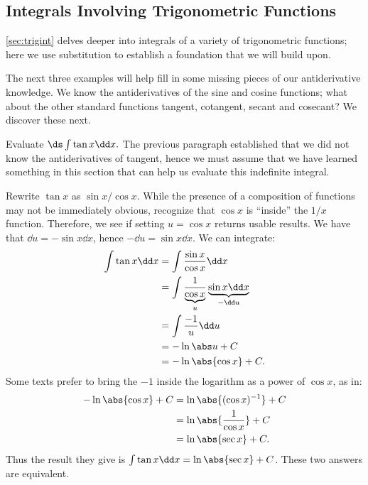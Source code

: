 \subsection{Integrals Involving Trigonometric Functions}

\autoref{sec:trigint} delves deeper into integrals of a variety of trigonometric functions; here we use substitution to establish a foundation that we will build upon. 

The next three examples will help fill in some missing pieces of our antiderivative knowledge. We know the antiderivatives of the sine and cosine functions; what about the other standard functions tangent, cotangent, secant and cosecant? We discover these next.

\begin{example}\label{ex_sub6}
Evaluate $\ds \int \tan x\dd x.$
\solution
The previous paragraph established that we did not know the antiderivatives of tangent, hence we must assume that we have learned something in this section that  can help us evaluate this indefinite integral. 

Rewrite $\tan x$ as $\sin x/\cos x$. While the presence of a composition of functions may not be immediately obvious, recognize that $\cos x$ is ``inside'' the $1/x$ function. Therefore, we see if setting $u = \cos x$ returns usable results. We have that $\dd u = -\sin x\dd x$, hence $-\dd u = \sin x\dd x$. We can integrate:
\begin{align*}
	\int \tan x \dd x
	&= \int \frac{\sin x}{\cos x}\dd x \\
	&= \int \frac1{\underbrace{\cos x}_u}\underbrace{\sin x\dd x}_{-\dd u} \\
	&= \int \frac {-1}u \dd u\\
	&= -\ln \abs u + C \\
	&= -\ln \abs{\cos x} + C.
\end{align*}
Some texts prefer to bring the $-1$ inside the logarithm as a power of $\cos x$, as in:
\begin{align*}
	-\ln\abs{\cos x} + C
	&= \ln\abs{(\cos x)^{-1}} + C\\
	&= \ln \abs{\frac{1}{\cos x}} + C\\
	&= \ln \abs{\sec x} + C.
\end{align*}
Thus the result they give is $\int \tan x \dd x = \ln\abs{\sec x}+C$. These two answers are equivalent.
\end{example}

